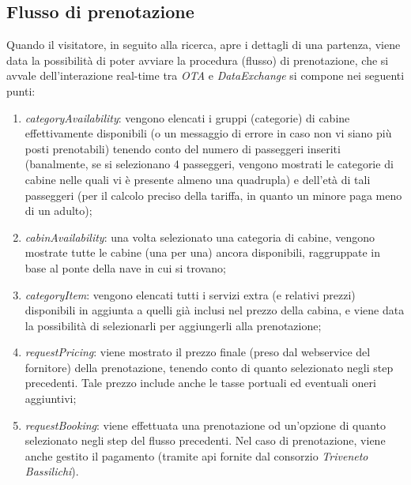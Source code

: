 \subsection{Flusso di prenotazione}
Quando il visitatore, in seguito alla ricerca, apre i dettagli di una partenza, viene data la possibilità di poter avviare la procedura (flusso) di prenotazione, che si avvale dell'interazione real-time tra \textit{OTA} e \textit{DataExchange} si compone nei seguenti punti:
\begin{enumerate}
	\item \textit{categoryAvailability}: vengono elencati i gruppi (categorie) di cabine effettivamente disponibili (o un messaggio di errore in caso non vi siano più posti prenotabili) tenendo conto del numero di passeggeri inseriti (banalmente, se si selezionano 4 passeggeri, vengono mostrati le categorie di cabine nelle quali vi è presente almeno una quadrupla) e dell'età di tali passeggeri (per il calcolo preciso della tariffa, in quanto un minore paga meno di un adulto);
	\item \textit{cabinAvailability}: una volta selezionato una categoria di cabine, vengono mostrate tutte le cabine (una per una) ancora disponibili, raggruppate in base al ponte della nave in cui si trovano;
	\item \textit{categoryItem}: vengono elencati tutti i servizi extra (e relativi prezzi) disponibili in aggiunta a quelli già inclusi nel prezzo della cabina, e viene data la possibilità di selezionarli per aggiungerli alla prenotazione;
	\item \textit{requestPricing}: viene mostrato il prezzo finale (preso dal \gls{webservice} del fornitore) della prenotazione, tenendo conto di quanto selezionato negli step precedenti. Tale prezzo include anche le tasse portuali ed eventuali oneri aggiuntivi;
	\item \textit{requestBooking}: viene effettuata una prenotazione od un'opzione di quanto selezionato negli step del flusso precedenti. Nel caso di prenotazione, viene anche gestito il pagamento (tramite \gls{api} fornite dal consorzio \textit{Triveneto Bassilichi}).
\end{enumerate}

